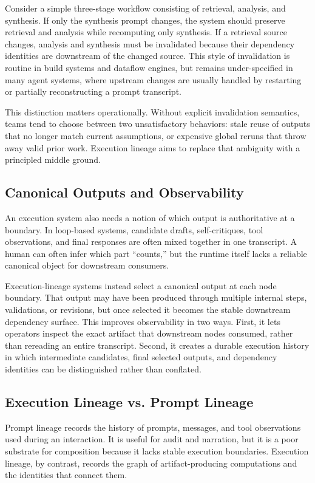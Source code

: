 \documentclass{article}
\begin{document}
Consider a simple three-stage workflow consisting of retrieval, analysis, and synthesis. If only the synthesis prompt changes, the system should preserve retrieval and analysis while recomputing only synthesis. If a retrieval source changes, analysis and synthesis must be invalidated because their dependency identities are downstream of the changed source. This style of invalidation is routine in build systems and dataflow engines, but remains under-specified in many agent systems, where upstream changes are usually handled by restarting or partially reconstructing a prompt transcript.

This distinction matters operationally. Without explicit invalidation semantics, teams tend to choose between two unsatisfactory behaviors: stale reuse of outputs that no longer match current assumptions, or expensive global reruns that throw away valid prior work. Execution lineage aims to replace that ambiguity with a principled middle ground.

\subsection{Canonical Outputs and Observability}

An execution system also needs a notion of which output is authoritative at a boundary. In loop-based systems, candidate drafts, self-critiques, tool observations, and final responses are often mixed together in one transcript. A human can often infer which part ``counts,'' but the runtime itself lacks a reliable canonical object for downstream consumers.

Execution-lineage systems instead select a canonical output at each node boundary. That output may have been produced through multiple internal steps, validations, or revisions, but once selected it becomes the stable downstream dependency surface. This improves observability in two ways. First, it lets operators inspect the exact artifact that downstream nodes consumed, rather than rereading an entire transcript. Second, it creates a durable execution history in which intermediate candidates, final selected outputs, and dependency identities can be distinguished rather than conflated.

\subsection{Execution Lineage vs. Prompt Lineage}

Prompt lineage records the history of prompts, messages, and tool observations used during an interaction. It is useful for audit and narration, but it is a poor substrate for composition because it lacks stable execution boundaries. Execution lineage, by contrast, records the graph of artifact-producing computations and the identities that connect them.
\end{document}
